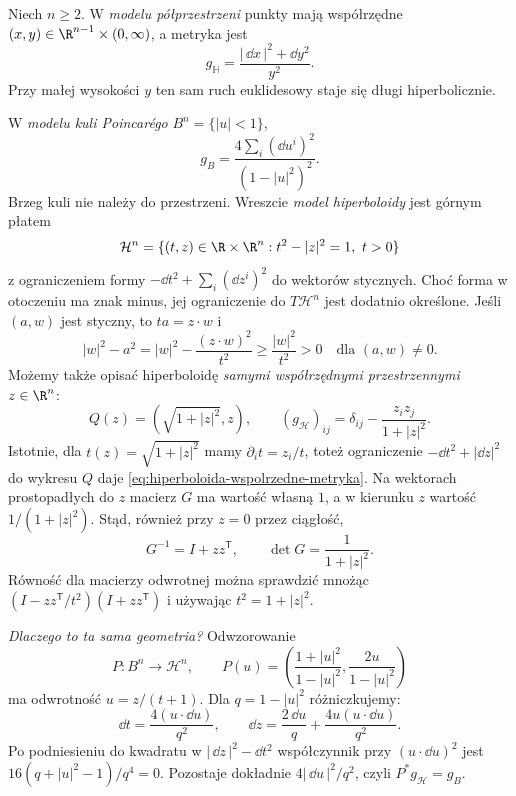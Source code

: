 \begin{przyklad}
\label{prz:trzy-modele-hiperboliczne}
Niech $n\geq2$. W \emph{modelu półprzestrzeni}
punkty mają współrzędne $(x,y)\in\R^{n-1}\times(0,\infty)$,
a metryka jest
\begin{equation}\label{eq:hip-polprzestrzen}
 g_{\mathbb H}=\frac{|\,\dd x\,|^2+\dd y^2}{y^2}.
\end{equation}
Przy małej wysokości $y$ ten sam ruch euklidesowy
staje się długi hiperbolicznie.

W \emph{modelu kuli Poincarégo} $B^n=\{|u|<1\}$,
\begin{equation}\label{eq:hip-kula}
 g_B=\frac{4\sum_i(\dd u^i)^2}{(1-|u|^2)^2}.
\end{equation}
Brzeg kuli nie należy do przestrzeni. Wreszcie
\emph{model hiperboloidy} jest górnym płatem
\[
 \mathcal H^n=\{(t,z)\in\R\times\R^n:
                    t^2-|z|^2=1,\ t>0\}
\]
z ograniczeniem formy $-\dd t^2+\sum_i(\dd z^i)^2$
do wektorów stycznych. Choć forma w otoczeniu
ma znak minus, jej ograniczenie do $T\mathcal H^n$
jest dodatnio określone. Jeśli $(a,w)$ jest styczny,
to $ta=z\cdot w$ i
\[
 |w|^2-a^2
 =|w|^2-\frac{(z\cdot w)^2}{t^2}
 \geq\frac{|w|^2}{t^2}>0
 \quad\text{dla }(a,w)\ne0.
\]
Możemy także opisać hiperboloidę \emph{samymi
współrzędnymi przestrzennymi} $z\in\R^n$:
\begin{equation}\label{eq:hiperboloida-wspolrzedne-metryka}
 Q(z)=(\sqrt{1+|z|^2},z),\qquad
 (g_{\mathcal H})_{ij}
   =\delta_{ij}-\frac{z_i z_j}{1+|z|^2}.
\end{equation}
Istotnie, dla $t(z)=\sqrt{1+|z|^2}$ mamy
$\partial_i t=z_i/t$, toteż ograniczenie
$-\dd t^2+|\dd z|^2$ do wykresu $Q$ daje
\eqref{eq:hiperboloida-wspolrzedne-metryka}.
Na wektorach prostopadłych do $z$ macierz $G$
ma wartość własną $1$, a w kierunku $z$
wartość $1/(1+|z|^2)$. Stąd, również przy $z=0$
przez ciągłość,
\begin{equation}\label{eq:hiperboloida-macierz-odwrotna}
 G^{-1}=I+zz^{\mathsf T},\qquad
 \det G=\frac1{1+|z|^2}.
\end{equation}
Równość dla macierzy odwrotnej można sprawdzić
mnożąc $(I-zz^{\mathsf T}/t^2)(I+zz^{\mathsf T})$
i używając $t^2=1+|z|^2$.

\emph{Dlaczego to ta sama geometria?}
Odwzorowanie
\[
 P:B^n\longrightarrow\mathcal H^n,\qquad
 P(u)=\left(\frac{1+|u|^2}{1-|u|^2},
            \frac{2u}{1-|u|^2}\right)
\]
ma odwrotność $u=z/(t+1)$.
Dla $q=1-|u|^2$ różniczkujemy:
\[
 \dd t=\frac{4(u\cdot\dd u)}{q^2},
 \qquad
 \dd z=\frac{2\,\dd u}{q}
          +\frac{4u(u\cdot\dd u)}{q^2}.
\]
Po podniesieniu do kwadratu w
$|\,\dd z\,|^2-\dd t^2$ współczynnik przy
$(u\cdot\dd u)^2$ jest
$16(q+|u|^2-1)/q^4=0$. Pozostaje dokładnie
$4|\,\dd u\,|^2/q^2$, czyli $P^*g_{\mathcal H}=g_B$.


\end{przyklad}
